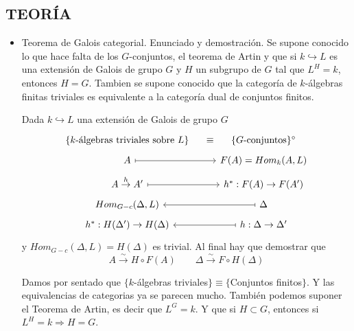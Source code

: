 \subsection*{TEORÍA}
\begin{itemize}
    \item Teorema de Galois categorial. Enunciado y demostraci\'on. Se supone conocido lo que hace falta de los $G$-conjuntos, el teorema de Artin y que si $k \hookrightarrow L$ es una extensi\'on de Galois de grupo $G$ y $H$ un subgrupo de $G$ tal que $L^H = k$, entonces $H = G$. Tambien se supone conocido que la categor\'ia de $k$-\'algebras finitas triviales es equivalente a la categor\'ia dual de conjuntos finitos.
    
    Dada $k \hookrightarrow L$ una extensi\'on de Galois de grupo $G$
    $$\bt \{k\text{-\'algebras triviales sobre } L\} \rar[phantom]{\equiv} & \{G\text{-conjuntos}\}^{\circ} \\[-5mm] A \rarmaps & F(A) = Hom_k(A,L) \\[-5mm] A \overset{h}{\rightarrow} A' \rarmaps & h^*: F(A) \rightarrow F(A') \\[-5mm] Hom_{G-c}(\Delta, L) & \arrow[mapsto]{l} \Delta \\[-5mm] h^* : H(\Delta') \rightarrow H(\Delta) &  \arrow[mapsto]{l}  h: \Delta \rightarrow \Delta' \et $$
    y $Hom_{G-c}(\Delta, L) =H(\Delta)$ es trivial. Al final hay que demostrar que 
    $$A \overset{\sim}{\longrightarrow} H \circ F(A) \qquad \Delta\overset{\sim}{\longrightarrow} F\circ H(\Delta)  $$

    Damos por sentado que $\{k$-\'algebras triviales$\} \equiv \{$Conjuntos finitos$\}$. Y las equivalencias de  categorias ya se parecen mucho. Tambi\'en podemos suponer el Teorema de Artin, es decir que $L^G=k$. Y que si $H \subset G$, entonces si $L^H=k\Rightarrow H=G$. 


\end{itemize}

